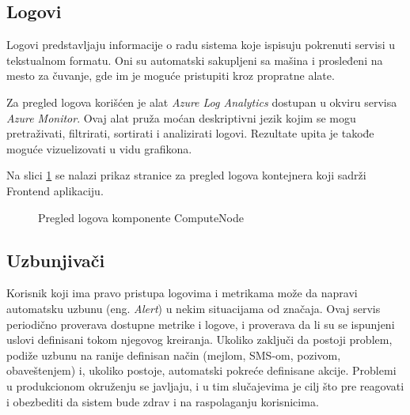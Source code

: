 \documentclass[12pt,oneside]{memoir}
\begin{document}
\subsection{Logovi}

Logovi predstavljaju informacije o radu sistema koje ispisuju pokrenuti servisi u tekstualnom formatu. Oni su automatski sakupljeni sa mašina i prosleđeni na mesto za čuvanje, gde im je moguće pristupiti kroz propratne alate.

Za pregled logova korišćen je alat \emph{Azure Log Analytics} dostupan u okviru servisa \emph{Azure Monitor}. Ovaj alat pruža moćan deskriptivni jezik kojim se mogu pretraživati, filtrirati, sortirati i analizirati logovi. Rezultate upita je takođe moguće vizuelizovati u vidu grafikona.

Na slici \ref{fig:computenodelogs} se nalazi prikaz stranice za pregled logova kontejnera koji sadrži Frontend aplikaciju.

\begin{figure}[!ht]
  \centering
  \caption{Pregled logova komponente ComputeNode}
  \label{fig:computenodelogs}
\end{figure}


\subsection{Uzbunjivači}

Korisnik koji ima pravo pristupa logovima i metrikama može da napravi automatsku uzbunu (eng. \emph{Alert}) u nekim situacijama od značaja. Ovaj servis periodično proverava dostupne metrike i logove, i proverava da li su se ispunjeni uslovi definisani tokom njegovog kreiranja. Ukoliko zaključi da postoji problem, podiže uzbunu na ranije definisan način (mejlom, SMS-om, pozivom, obaveštenjem) i, ukoliko postoje, automatski pokreće definisane akcije. Problemi u produkcionom okruženju se javljaju, i u tim slučajevima je cilj što pre reagovati i obezbediti da sistem bude zdrav i na raspolaganju korisnicima.
\end{document}
